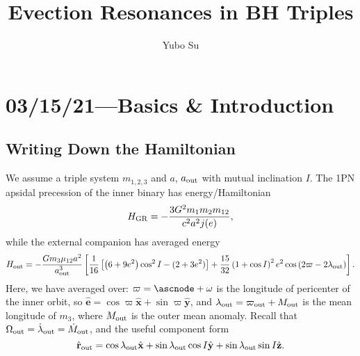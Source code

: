 \documentclass[10pt,
        usenames, %
        dvipsnames %
    ]{article}
\newcommand*{\bm}[1]{\boldsymbol{\mathbf{#1}}}
\newcommand*{\uv}[1]{\hat{\bm{#1}}}
\newcommand*{\p}[1]{\left(#1\right)}
\newcommand*{\s}[1]{\left[#1\right]}
\begin{document}
\onehalfspacing

\pagestyle{fancy}
\rhead{}
\cfoot{\thepage/\pageref{LastPage}}

\title{Evection Resonances in BH Triples}
\author{Yubo Su}
\date{}

\maketitle

\tableofcontents

\section{03/15/21---Basics \& Introduction}

\subsection{Writing Down the Hamiltonian}

We assume a triple system $m_{1,2,3}$ and $a$, $a_{\rm out}$ with mutual
inclination $I$. The 1PN apsidal precession of the inner binary has
energy/Hamiltonian
\begin{equation}
    H_{\rm GR} = -\frac{3G^2m_1m_2m_{12}}{c^2a^2j(e)},
\end{equation}
while the external companion has averaged energy
\begin{equation}
    H_{\rm out} = -\frac{Gm_3\mu_{12} a^2}{a_{\rm out}^3}\s{
        \frac{1}{16}\s{\p{6 + 9e^2}\cos^2 I
            - (2 + 3e^2)} + \frac{15}{32}
                \p{1 + \cos I}^2 e^2 \cos\p{2\varpi - 2\lambda_{\rm out}}}.
\end{equation}
Here, we have averaged over: $\varpi = \ascnode + \omega$ is the longitude of
pericenter of the inner orbit, so $\uv{e} = \cos \varpi \uv{x} + \sin \varpi
\uv{y}$, and $\lambda_{\rm out} = \varpi_{\rm out} + M_{\rm out}$ is the mean
longitude of $m_3$, where $M_{\rm out}$ is the outer mean anomaly. Recall that
$\Omega_{\rm out} = \dot{\lambda}_{\rm out} = \dot{M}_{\rm out}$, and the useful
component form
\begin{equation}
    \uv{r}_{\rm out} = \cos \lambda_{\rm out}\uv{x}
        + \sin \lambda_{\rm out} \cos I \uv{y}
        + \sin \lambda_{\rm out} \sin I \uv{z}.
\end{equation}
\end{document}
